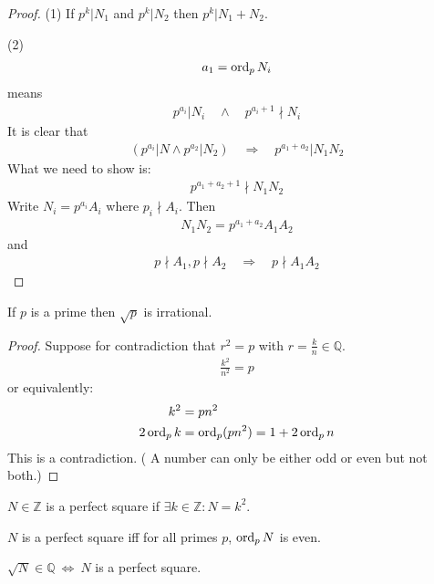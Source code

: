 \begin{proof} (1)
If $p^k|N_1$ and $p^k|N_2$ then $p^k|N_1+N_2$.

(2)
\begin{align*}
a_1 = \operatorname{ord}_p N_i
\end{align*}
 means
\begin{align*}
p^{a_i} | N_i\quad \wedge \quad p^{a_i +1} \nmid N_i
\end{align*}
It is clear that
\begin{align*}
 (p^{a_i}|N \wedge p^{a_2}|N_2) \quad \Rightarrow \quad p^{a_1+a_2}| N_1N_2
\end{align*}
What we need to show is:
\begin{align*}
p^{a_1+a_2+1} \nmid N_1N_2
\end{align*}
Write $N_i = p^{a_i} A_i$ where $p_i \nmid A_i$. Then 
\begin{align*}
N_1N_2 = p^{a_1+a_2} A_1A_2
\end{align*}
and
\begin{align*}
p \nmid A_1, p \nmid A_2 \quad \Rightarrow \quad p \nmid A_1 A_2
\end{align*}
\end{proof}

\begin{rt}
If $p$ is a prime then $\sqrt p$ is irrational. 
\end{rt}
\begin{proof}
Suppose for contradiction that $r^2=p$ with $r=\frac k n \in \mathbb Q$.
\begin{align*}
\frac{k^2}{n^2} = p
\end{align*}
or equivalently: 
\begin{align*}
k^2 & = pn^2 \\
2 \operatorname{ord}_p k & = \operatorname{ord}_p(pn^2) = 1+ 2 \operatorname{ord}_p n
\end{align*}
This is a contradiction. ( A number can only be either odd or even but not both.)
\end{proof}


\begin{df}
$N \in \mathbb Z$ is a perfect square if $\exists k \in \mathbb Z: N = k^2$.
\end{df}
\begin{ec}
$N$ is a perfect square iff for all primes $p$, $\operatorname{ord}_p N$ is even.
\end{ec}
\begin{ex}
$\sqrt N \in \mathbb Q ~ \Leftrightarrow ~ N$ is a perfect square.
\end{ex}

